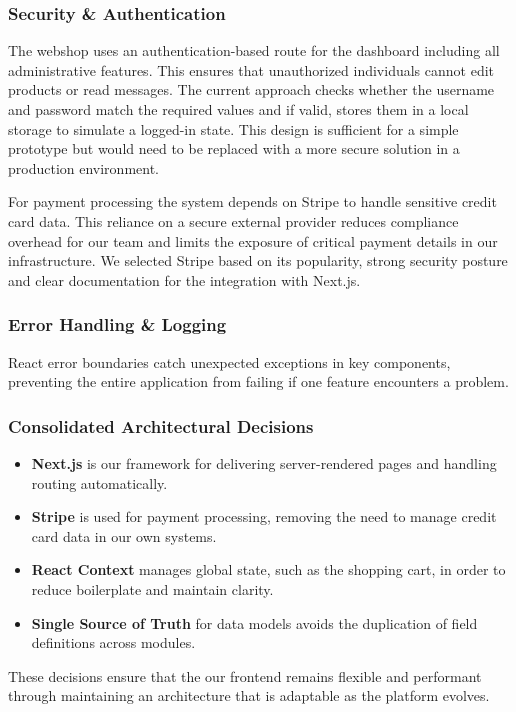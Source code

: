 \subsubsection{Security \& Authentication}
The webshop uses an authentication-based route for the dashboard including all administrative features. This ensures that unauthorized individuals cannot edit products or read messages. The current approach checks whether the username and password match the required values and if valid, stores them in a local storage to simulate a logged-in state. This design is sufficient for a simple prototype but would need to be replaced with a more secure solution in a production environment.

For payment processing the system depends on Stripe to handle sensitive credit card data. This reliance on a secure external provider reduces compliance overhead for our team and limits the exposure of critical payment details in our infrastructure. We selected Stripe based on its popularity, strong security posture and clear documentation for the integration with Next.js. 

\subsubsection{Error Handling \& Logging}
React error boundaries catch unexpected exceptions in key components, preventing the entire application from failing if one feature encounters a problem. 

\subsubsection{Consolidated Architectural Decisions}
\begin{itemize}
  \item \textbf{Next.js} is our framework for delivering server-rendered pages and handling routing automatically.
  \item \textbf{Stripe} is used for payment processing, removing the need to manage credit card data in our own systems.
  \item \textbf{React Context} manages global state, such as the shopping cart, in order to reduce boilerplate and maintain clarity.
  \item \textbf{Single Source of Truth} for data models avoids the duplication of field definitions across modules.
\end{itemize}

These decisions ensure that the our frontend remains flexible and performant through maintaining an architecture that is adaptable as the platform evolves.

